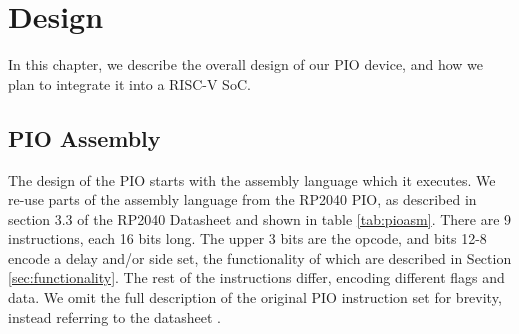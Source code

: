 \chapter{Design}
\label{ch:design}

In this chapter, we describe the overall design of our PIO device, and how we plan to integrate it into a RISC-V SoC.

\section{PIO Assembly}
\label{sec:pioasm}

The design of the PIO starts with the assembly language which it executes. We re-use parts of the assembly language from the RP2040 PIO, as described in section 3.3 of the RP2040 Datasheet and shown in table \ref{tab:pioasm}. There are 9 instructions, each 16 bits long. The upper 3 bits are the opcode, and bits 12-8 encode a delay and/or side set, the functionality of which are described in Section \ref{sec:functionality}. The rest of the instructions differ, encoding different flags and data. We omit the full description of the original PIO instruction set for brevity, instead referring to the datasheet \cite{rp2040}.

